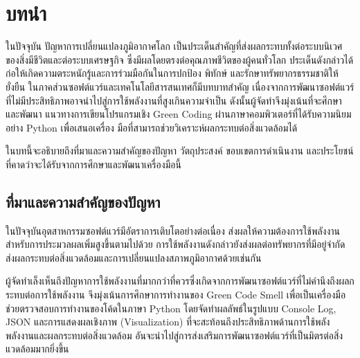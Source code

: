 \chapter{บทนำ}
\label{Ch:Introduction}
ในปัจจุบัน ปัญหาการเปลี่ยนแปลงภูมิอากาศโลก เป็นประเด็นสำคัญที่ส่งผลกระทบทั้งต่อระบบนิเวศของสิ่งมีชีวิตและต่อระบบเศรษฐกิจ ซึ่งมีผลโดยตรงต่อคุณภาพชีวิตของผู้คนทั่วโลก ประเด็นดังกล่าวได้ก่อให้เกิดความตระหนักรู้และการร่วมมือกันในการปกป้อง พิทักษ์ และรักษาทรัพยากรธรรมชาติให้ยั่งยืน ในภาคส่วนซอฟต์แวร์และเทคโนโลยีสารสนเทศก็มีบทบาทสำคัญ เนื่องจากการพัฒนาซอฟต์แวร์ที่ไม่มีประสิทธิภาพอาจนำไปสู่การใช้พลังงานที่สูงเกินความจำเป็น ดังนั้นผู้จัดทำจึงมุ่งเน้นที่จะศึกษาและพัฒนา แนวทางการเขียนโปรแกรมเชิง Green Coding ผ่านภาษาคอมพิวเตอร์ที่ได้รับความนิยมอย่าง Python เพื่อเสนอเครื่อง
มือที่สามารถช่วยวิเคราะห์ผลกระทบต่อสิ่งแวดล้อมได้

ในบทนี้จะอธิบายถึงที่มาและความสำคัญของปัญหา วัตถุประสงค์ ขอบเขตการดำเนินงาน และประโยชน์ที่คาดว่าจะได้รับจากการศึกษาและพัฒนาเครื่องมือนี้


\section{ที่มาและความสำคัญของปัญหา}
\label{Sec:ProblemStatement}
ในปัจจุบันอุตสาหกรรมซอฟต์แวร์มีอัตราการเติบโตอย่างต่อเนื่อง ส่งผลให้ความต้องการใช้พลังงานสำหรับการประมวลผลเพิ่มสูงขึ้นตามไปด้วย การใช้พลังงานดังกล่าวยังส่งผลต่อทรัพยากรที่มีอยู่จำกัด ส่งผลกระทบต่อสิ่งแวดล้อมและการเปลี่ยนแปลงสภาพภูมิอากาศด้วยเช่นกัน

ผู้จัดทำเล็งเห็นถึงปัญหาการใช้พลังงานที่มากกว่าที่ควรซึ่งเกิดจากการพัฒนาซอฟต์แวร์ที่ไม่คำนึงถึงผลกระทบต่อการใช้พลังงาน จึงมุ่งเน้นการศึกษาการทำงานของ Green Code Smell เพื่อเป็นเครื่องมือช่วยตรวจสอบการทำงานของโค้ดในภาษา Python โดยจัดทำผลลัพธ์ในรูปแบบ Console Log, JSON และการแสดงผลเชิงภาพ (Visualization) ที่จะสะท้อนถึงประสิทธิภาพด้านการใช้พลังพลังงานและผลกระทบต่อสิ่งแวดล้อม อันจะนำไปสู่การส่งเสริมการพัฒนาซอฟต์แวร์ที่เป็นมิตรต่อสิ่งแวดล้อมมากยิ่งขึ้น


